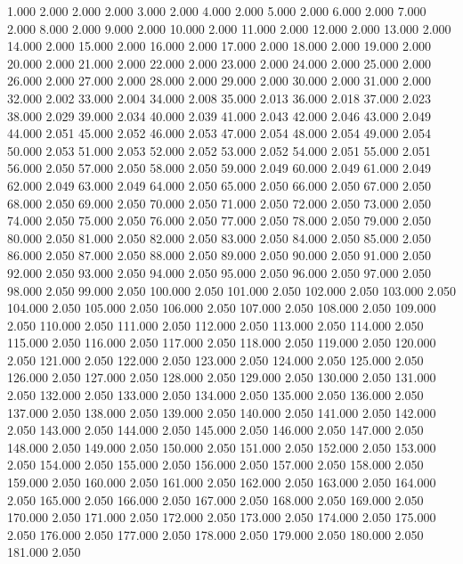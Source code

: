 1.000 2.000 
2.000 2.000 
3.000 2.000 
4.000 2.000 
5.000 2.000 
6.000 2.000 
7.000 2.000 
8.000 2.000 
9.000 2.000 
10.000 2.000 
11.000 2.000 
12.000 2.000 
13.000 2.000 
14.000 2.000 
15.000 2.000 
16.000 2.000 
17.000 2.000 
18.000 2.000 
19.000 2.000 
20.000 2.000 
21.000 2.000 
22.000 2.000 
23.000 2.000 
24.000 2.000 
25.000 2.000 
26.000 2.000 
27.000 2.000 
28.000 2.000 
29.000 2.000 
30.000 2.000 
31.000 2.000 
32.000 2.002 
33.000 2.004 
34.000 2.008 
35.000 2.013 
36.000 2.018 
37.000 2.023 
38.000 2.029 
39.000 2.034 
40.000 2.039 
41.000 2.043 
42.000 2.046 
43.000 2.049 
44.000 2.051 
45.000 2.052 
46.000 2.053 
47.000 2.054 
48.000 2.054 
49.000 2.054 
50.000 2.053 
51.000 2.053 
52.000 2.052 
53.000 2.052 
54.000 2.051 
55.000 2.051 
56.000 2.050 
57.000 2.050 
58.000 2.050 
59.000 2.049 
60.000 2.049 
61.000 2.049 
62.000 2.049 
63.000 2.049 
64.000 2.050 
65.000 2.050 
66.000 2.050 
67.000 2.050 
68.000 2.050 
69.000 2.050 
70.000 2.050 
71.000 2.050 
72.000 2.050 
73.000 2.050 
74.000 2.050 
75.000 2.050 
76.000 2.050 
77.000 2.050 
78.000 2.050 
79.000 2.050 
80.000 2.050 
81.000 2.050 
82.000 2.050 
83.000 2.050 
84.000 2.050 
85.000 2.050 
86.000 2.050 
87.000 2.050 
88.000 2.050 
89.000 2.050 
90.000 2.050 
91.000 2.050 
92.000 2.050 
93.000 2.050 
94.000 2.050 
95.000 2.050 
96.000 2.050 
97.000 2.050 
98.000 2.050 
99.000 2.050 
100.000 2.050 
101.000 2.050 
102.000 2.050 
103.000 2.050 
104.000 2.050 
105.000 2.050 
106.000 2.050 
107.000 2.050 
108.000 2.050 
109.000 2.050 
110.000 2.050 
111.000 2.050 
112.000 2.050 
113.000 2.050 
114.000 2.050 
115.000 2.050 
116.000 2.050 
117.000 2.050 
118.000 2.050 
119.000 2.050 
120.000 2.050 
121.000 2.050 
122.000 2.050 
123.000 2.050 
124.000 2.050 
125.000 2.050 
126.000 2.050 
127.000 2.050 
128.000 2.050 
129.000 2.050 
130.000 2.050 
131.000 2.050 
132.000 2.050 
133.000 2.050 
134.000 2.050 
135.000 2.050 
136.000 2.050 
137.000 2.050 
138.000 2.050 
139.000 2.050 
140.000 2.050 
141.000 2.050 
142.000 2.050 
143.000 2.050 
144.000 2.050 
145.000 2.050 
146.000 2.050 
147.000 2.050 
148.000 2.050 
149.000 2.050 
150.000 2.050 
151.000 2.050 
152.000 2.050 
153.000 2.050 
154.000 2.050 
155.000 2.050 
156.000 2.050 
157.000 2.050 
158.000 2.050 
159.000 2.050 
160.000 2.050 
161.000 2.050 
162.000 2.050 
163.000 2.050 
164.000 2.050 
165.000 2.050 
166.000 2.050 
167.000 2.050 
168.000 2.050 
169.000 2.050 
170.000 2.050 
171.000 2.050 
172.000 2.050 
173.000 2.050 
174.000 2.050 
175.000 2.050 
176.000 2.050 
177.000 2.050 
178.000 2.050 
179.000 2.050 
180.000 2.050 
181.000 2.050 

